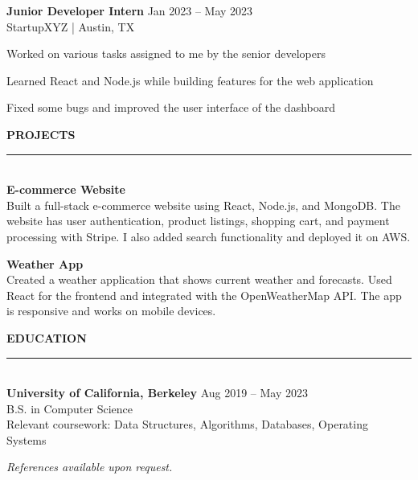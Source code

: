 \documentclass[letterpaper,11pt]{article}
\begin{document}
\begin{minipage}[t]{12.7cm}
\vspace{0.3cm}

{\color{darktext}\bfseries Junior Developer Intern} \hfill {\color{medtext}\small Jan 2023 -- May 2023}\\
{\color{medtext}\small StartupXYZ | Austin, TX}\\[4pt]
\begin{itemize}[leftmargin=12pt, itemsep=1pt, parsep=0pt, topsep=0pt]
  {\color{darktext}\small
  \item Worked on various tasks assigned to me by the senior developers
  \item Learned React and Node.js while building features for the web application
  \item Fixed some bugs and improved the user interface of the dashboard
  }
\end{itemize}

\vspace{0.5cm}

{\color{accent}\fontsize{13}{15}\selectfont\bfseries PROJECTS}\\[2pt]
{\color{accent}\rule{2cm}{1.5pt}}\\[6pt]

{\color{darktext}\bfseries E-commerce Website}\\[3pt]
{\color{darktext}\small
Built a full-stack e-commerce website using React, Node.js, and MongoDB. The website has user authentication, product listings, shopping cart, and payment processing with Stripe. I also added search functionality and deployed it on AWS.
}

\vspace{0.3cm}

{\color{darktext}\bfseries Weather App}\\[3pt]
{\color{darktext}\small
Created a weather application that shows current weather and forecasts. Used React for the frontend and integrated with the OpenWeatherMap API. The app is responsive and works on mobile devices.
}

\vspace{0.5cm}

{\color{accent}\fontsize{13}{15}\selectfont\bfseries EDUCATION}\\[2pt]
{\color{accent}\rule{2cm}{1.5pt}}\\[6pt]

{\color{darktext}\bfseries University of California, Berkeley} \hfill {\color{medtext}\small Aug 2019 -- May 2023}\\
{\color{medtext}\small B.S. in Computer Science}\\[2pt]
{\color{darktext}\small Relevant coursework: Data Structures, Algorithms, Databases, Operating Systems}

\vspace{0.5cm}

{\color{medtext}\small\textit{References available upon request.}}

\end{minipage}
\end{document}
